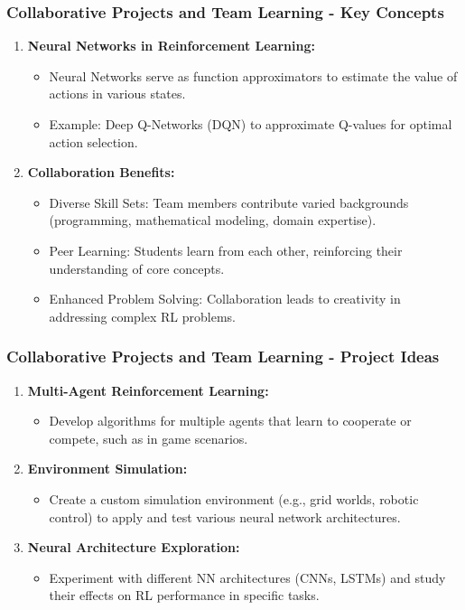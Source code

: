 \documentclass[aspectratio=169]{beamer}
\begin{document}
\begin{frame}[fragile]
    \frametitle{Collaborative Projects and Team Learning - Key Concepts}
    \begin{enumerate}
        \item \textbf{Neural Networks in Reinforcement Learning:}
        \begin{itemize}
            \item Neural Networks serve as function approximators to estimate the value of actions in various states.
            \item Example: Deep Q-Networks (DQN) to approximate Q-values for optimal action selection.
        \end{itemize}
        
        \item \textbf{Collaboration Benefits:}
        \begin{itemize}
            \item Diverse Skill Sets: Team members contribute varied backgrounds (programming, mathematical modeling, domain expertise).
            \item Peer Learning: Students learn from each other, reinforcing their understanding of core concepts.
            \item Enhanced Problem Solving: Collaboration leads to creativity in addressing complex RL problems.
        \end{itemize}
    \end{enumerate}
\end{frame}

\begin{frame}[fragile]
    \frametitle{Collaborative Projects and Team Learning - Project Ideas}
    \begin{enumerate}
        \item \textbf{Multi-Agent Reinforcement Learning:}
        \begin{itemize}
            \item Develop algorithms for multiple agents that learn to cooperate or compete, such as in game scenarios.
        \end{itemize}
        
        \item \textbf{Environment Simulation:}
        \begin{itemize}
            \item Create a custom simulation environment (e.g., grid worlds, robotic control) to apply and test various neural network architectures.
        \end{itemize}

        \item \textbf{Neural Architecture Exploration:}
        \begin{itemize}
            \item Experiment with different NN architectures (CNNs, LSTMs) and study their effects on RL performance in specific tasks.
        \end{itemize}
    \end{enumerate}
\end{frame}
\end{document}
